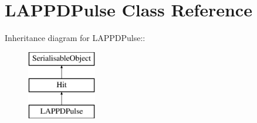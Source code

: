 \hypertarget{classLAPPDPulse}{
\section{LAPPDPulse Class Reference}
\label{classLAPPDPulse}
}
Inheritance diagram for LAPPDPulse::\begin{figure}[H]
\begin{center}
\leavevmode
\includegraphics[height=3cm]{classLAPPDPulse}
\end{center}
\end{figure}
